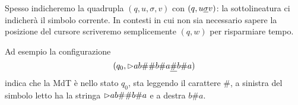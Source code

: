 Spesso indicheremo la quadrupla $(q, u, \sigma, v)$ con $(q, u\underline{\sigma}v)$: la sottolineatura ci indicherà il simbolo corrente. In contesti in cui non sia necessario sapere la posizione del cursore scriveremo semplicemente $(q, w)$ per risparmiare tempo.

\begin{example}
    Ad esempio la configurazione \[
        (q_0, {\vartriangleright} ab\#\#b\#a\underline{\#}b\#a)
    \] indica che la MdT è nello stato $q_0$, sta leggendo il carattere $\#$, a sinistra del simbolo letto ha la stringa ${\vartriangleright} ab\#\#b\#a$ e a destra $b\#a$.
\end{example}